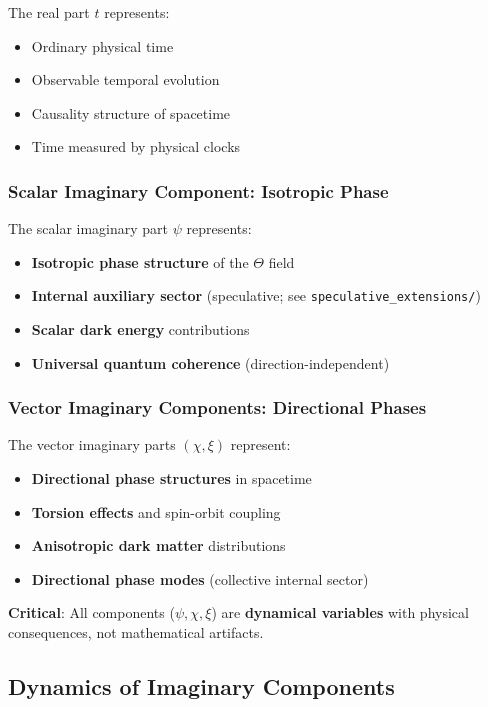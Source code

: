 The real part $t$ represents:
\begin{itemize}
    \item Ordinary physical time
    \item Observable temporal evolution
    \item Causality structure of spacetime
    \item Time measured by physical clocks
\end{itemize}

\subsubsection{Scalar Imaginary Component: Isotropic Phase}

The scalar imaginary part $\psi$ represents:
\begin{itemize}
    \item \textbf{Isotropic phase structure} of the $\Theta$ field
    \item \textbf{Internal auxiliary sector} (speculative; see \texttt{speculative\_extensions/})
    \item \textbf{Scalar dark energy} contributions
    \item \textbf{Universal quantum coherence} (direction-independent)
\end{itemize}

\subsubsection{Vector Imaginary Components: Directional Phases}

The vector imaginary parts $(\chi, \xi)$ represent:
\begin{itemize}
    \item \textbf{Directional phase structures} in spacetime
    \item \textbf{Torsion effects} and spin-orbit coupling
    \item \textbf{Anisotropic dark matter} distributions
    \item \textbf{Directional phase modes} (collective internal sector)
\end{itemize}

\textbf{Critical}: All components ($\psi, \chi, \xi$) are \textbf{dynamical variables} with physical consequences, not mathematical artifacts.

\subsection{Dynamics of Imaginary Components}

